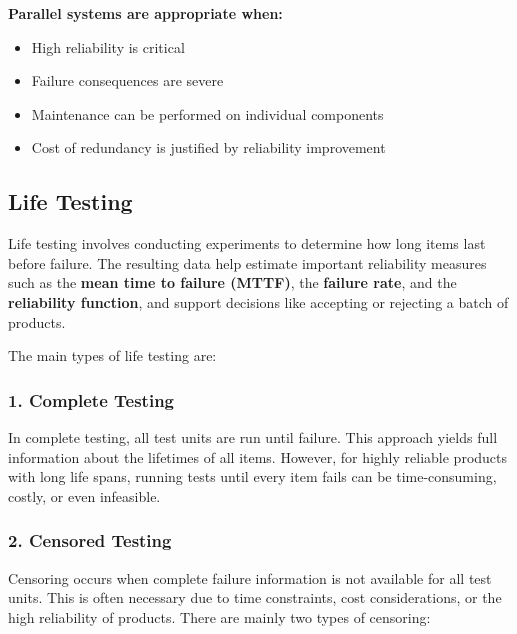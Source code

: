 \documentclass[twoside]{book}
\begin{document}
\textbf{Parallel systems are appropriate when:}
\begin{itemize}
    \item High reliability is critical
    \item Failure consequences are severe
    \item Maintenance can be performed on individual components
    \item Cost of redundancy is justified by reliability improvement
\end{itemize}

\subsection{Life Testing}

Life testing involves conducting experiments to determine how long items last before failure. The resulting data help estimate important reliability measures such as the \textbf{mean time to failure (MTTF)}, the \textbf{failure rate}, and the \textbf{reliability function}, and support decisions like accepting or rejecting a batch of products.

The main types of life testing are:

\subsubsection{1. Complete Testing}

In complete testing, all test units are run until failure. This approach yields full information about the lifetimes of all items. However, for highly reliable products with long life spans, running tests until every item fails can be time-consuming, costly, or even infeasible.

\subsubsection{2. Censored Testing}

Censoring occurs when complete failure information is not available for all test units. This is often necessary due to time constraints, cost considerations, or the high reliability of products. There are mainly two types of censoring:
\end{document}
